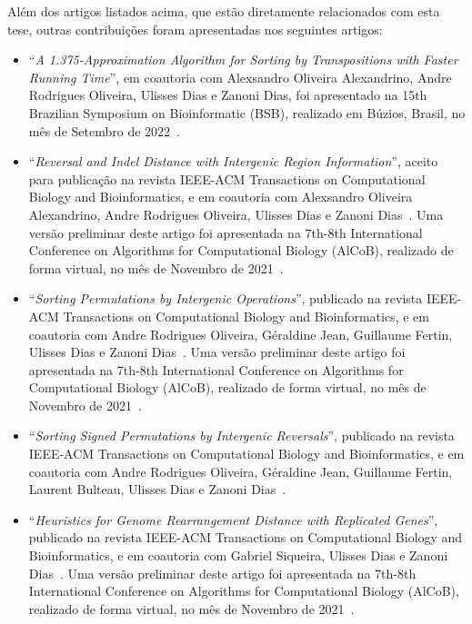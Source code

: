 Além dos artigos listados acima, que estão diretamente relacionados com esta tese, outras contribuições foram apresentadas nos seguintes artigos:

\begin{itemize}
  \item ``\textit{A 1.375-Approximation Algorithm for Sorting by Transpositions with Faster Running Time}'', em coautoria com Alexsandro Oliveira Alexandrino, Andre Rodrigues Oliveira, Ulisses Dias e Zanoni Dias, foi apresentado na 15th Brazilian Symposium on Bioinformatic (BSB), realizado em Búzios, Brasil, no mês de Setembro de 2022~\cite{2022bsb-alexandrino-etal}.

  \item ``\textit{Reversal and Indel Distance with Intergenic Region Information}'', aceito para publicação na revista IEEE-ACM Transactions on Computational Biology and Bioinformatics, e em coautoria com Alexsandro Oliveira Alexandrino, Andre Rodrigues Oliveira, Ulisses Dias e Zanoni Dias~\cite{2022b-alexandrino-etal}. Uma versão preliminar deste artigo foi apresentada na 7th-8th International Conference on Algorithms for Computational Biology (AlCoB), realizado de forma virtual, no mês de Novembro de 2021~\cite{2021b-alexandrino-etal}.

  \item ``\textit{Sorting Permutations by Intergenic Operations}'', publicado na revista IEEE-ACM Transactions on Computational Biology and Bioinformatics, e em coautoria com Andre Rodrigues Oliveira, Géraldine Jean, Guillaume Fertin, Ulisses Dias e Zanoni Dias~\cite{2021a-oliveira-etal}. Uma versão preliminar deste artigo foi apresentada na 7th-8th International Conference on Algorithms for Computational Biology (AlCoB), realizado de forma virtual, no mês de Novembro de 2021~\cite{2020-oliveira-etal}.

  \item ``\textit{Sorting Signed Permutations by Intergenic Reversals}'', publicado na revista IEEE-ACM Transactions on Computational Biology and Bioinformatics, e em coautoria com Andre Rodrigues Oliveira, Géraldine Jean, Guillaume Fertin, Laurent Bulteau, Ulisses Dias e Zanoni Dias~\cite{2021b-oliveira-etal}.

  \item ``\textit{Heuristics for Genome Rearrangement Distance with Replicated Genes}'', publicado na revista IEEE-ACM Transactions on Computational Biology and Bioinformatics, e em coautoria com Gabriel Siqueira, Ulisses Dias e Zanoni Dias~\cite{2021a-siqueira-etal}. Uma versão preliminar deste artigo foi apresentada na 7th-8th International Conference on Algorithms for Computational Biology (AlCoB), realizado de forma virtual, no mês de Novembro de 2021~\cite{2020-siqueira-etal}.


\end{itemize}
